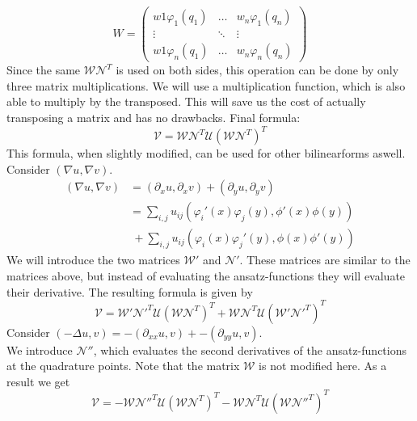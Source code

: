 \[W=
\begin{pmatrix}
w1 \varphi_1(q_1) & \hdots & w_n \varphi_1(q_n) \\
\vdots & \ddots & \vdots \\
w1 \varphi_n(q_1) & \hdots & w_n \varphi_n(q_n)
\end{pmatrix}
\]
Since the same $\mathcal{W} \mathcal{N}^T$ is used on both sides, this operation can be done by only three matrix multiplications. We will use a multiplication function, which is also able to multiply by the transposed. This will save us the cost of actually transposing a matrix and has no drawbacks. Final formula:
\begin{equation}
\mathcal{V} = \mathcal{W} \mathcal{N}^T \mathcal{U} (\mathcal{W} \mathcal{N}^T)^T
\end{equation}
This formula, when slightly modified, can be used for other bilinearforms aswell. Consider 
$(\nabla u, \nabla v)$.
\begin{align}
(\nabla u, \nabla v) &=(\partial_x u,\partial_x v) + (\partial_y u,\partial_y v) \\
					   &=\sum_{i,j} u_{ij} (\varphi_i'(x)\varphi_j(y),\phi'(x)\phi(y)) \\
					   & \ + \sum_{i,j} u_{ij} (\varphi_i(x)\varphi_j'(y),\phi(x)\phi'(y))
\end{align}
We will introduce the two matrices $\mathcal{W}'$ and $\mathcal{N}'$. These matrices are similar to the matrices above, but instead of evaluating the ansatz-functions they will evaluate their derivative. The resulting formula is given by
\[\mathcal{V}=\mathcal{W}' \mathcal{N}'^T \mathcal{U} (\mathcal{W} \mathcal{N}^T)^T +\mathcal{W} \mathcal{N}^T \mathcal{U} (\mathcal{W}' \mathcal{N}'^T)^T\]
Consider $(-\Delta u, v)=-(\partial_{xx} u,v) + -(\partial_{yy} u,v)$.\\
We introduce $\mathcal{N}''$, which evaluates the second derivatives of the ansatz-functions at the quadrature points. Note that the matrix $\mathcal{W}$ is not modified here. As a result we get 
\[\mathcal{V}=-\mathcal{W} \mathcal{N}''^T \mathcal{U} (\mathcal{W} \mathcal{N}^T)^T -\mathcal{W} \mathcal{N}^T \mathcal{U} (\mathcal{W} \mathcal{N}''^T)^T\]
